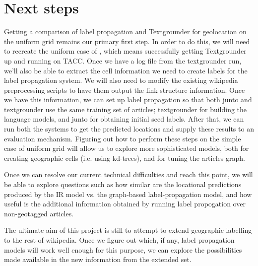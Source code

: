 \section{Next steps}
Getting a comparison of label propagation and Textgrounder for geolocation on
the uniform grid remains our primary first step.
In order to do this, we will need to recreate the uniform case of
\cite{rolleretal:12}, which means successfully getting Textgrounder up and
running on TACC.
Once we have a log file from the textgrounder run, we'll also be able to extract the cell information we
need to create labels for the label propagation system. We will also need to modify the existing wikipedia preprocessing scripts to have them output the link structure information. Once we have this information, we can set up label propagation so that both junto and textgrounder use the same training set of articles; textgrounder for building the language models, and junto for obtaining initial seed labels.
After that, we can run both the systems to get the predicted locations and supply these results to an evaluation mechanism.
Figuring out how to perform these steps on the simple case of uniform grid will allow us to
explore more sophisticated models, both for creating geographic cells (i.e.
using kd-trees), and for tuning the articles graph.
\par
Once we can resolve our current technical difficulties and reach this point, we
will be able to explore questions such as how similar are the locational
predictions produced by the IR model vs. the graph-based label-propagation
model, and how useful is the additional information obtained by running label propogation over non-geotagged articles.

The ultimate aim of this project is still to attempt to extend
geographic labelling to the rest of wikipedia. 
Once we figure out which, if any, label propagation models will work well
enough for this purpose, we can explore the possibilities made available in the
new information from the extended set.